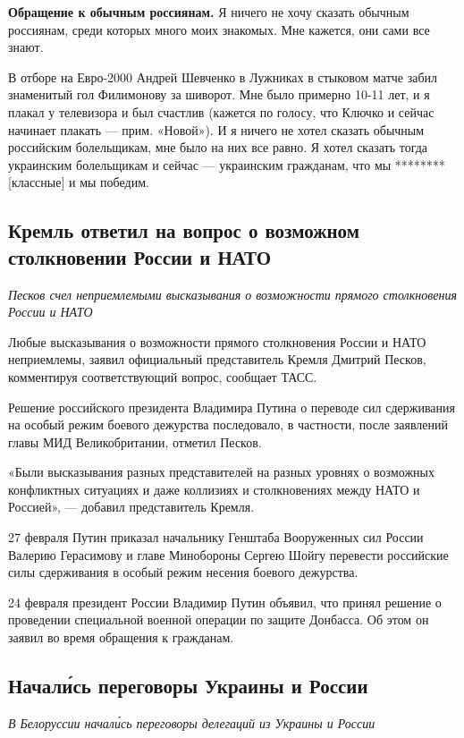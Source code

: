 \textbf{Обращение к обычным россиянам.} Я ничего не хочу сказать обычным россиянам, среди которых много моих знакомых. Мне кажется, они сами все знают.

В отборе на Евро-2000 Андрей Шевченко в Лужниках в стыковом матче забил знаменитый гол Филимонову за шиворот. Мне было примерно 10-11 лет, и я плакал у телевизора и был счастлив (кажется по голосу, что Ключко и сейчас начинает плакать --- прим. «Новой»). И я ничего не хотел сказать обычным российским болельщикам, мне было на них все равно. Я хотел сказать тогда украинским болельщикам и сейчас --- украинским гражданам, что мы ******** [классные] и мы победим.

\subsection{Кремль ответил на вопрос о возможном столкновении России и НАТО}
\textit{Песков счел неприемлемыми высказывания о возможности прямого столкновения России и НАТО}

Любые высказывания о возможности прямого столкновения России и НАТО неприемлемы, заявил официальный представитель Кремля Дмитрий Песков, комментируя соответствующий вопрос, сообщает ТАСС.

Решение российского президента Владимира Путина о переводе сил сдерживания на особый режим боевого дежурства последовало, в частности, после заявлений главы МИД Великобритании, отметил Песков.

«Были высказывания разных представителей на разных уровнях о возможных конфликтных ситуациях и даже коллизиях и столкновениях между НАТО и Россией», --- добавил представитель Кремля.

27 февраля Путин приказал начальнику Генштаба Вооруженных сил России Валерию Герасимову и главе Минобороны Сергею Шойгу перевести российские силы сдерживания в особый режим несения боевого дежурства.

24 февраля президент России Владимир Путин объявил, что принял решение о проведении специальной военной операции по защите Донбасса. Об этом он заявил во время обращения к гражданам.

\subsection{Начал\'{и}сь переговоры Украины и России}
\textit{В Белоруссии начал\'{и}сь переговоры делегаций из Украины и России}

